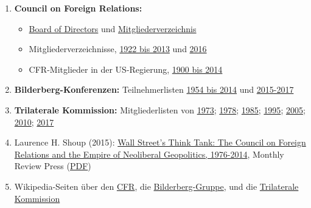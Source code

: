 \begin{enumerate}
\def\labelenumi{\arabic{enumi}.}
\tightlist
\item
  \textbf{Council on Foreign Relations:}

  \begin{itemize}
  \tightlist
  \item
    \href{https://www.cfr.org/board-directors}{Board of Directors} und
    \href{https://www.cfr.org/membership}{Mitgliederverzeichnis}
  \item
    Mitgliederverzeichnisse,
    \href{https://swprs.files.wordpress.com/2017/07/council-on-foreign-relations-membership-rosters-1922-2013.pdf}{1922
    bis 2013} und
    \href{https://swprs.files.wordpress.com/2017/07/cfr-members-2016.pdf}{2016}
  \item
    CFR-Mitglieder in der US-Regierung,
    \href{https://swprs.files.wordpress.com/2017/07/cfr-administration-members-1900-2014.pdf}{1900
    bis 2014}
  \end{itemize}
\item
  \textbf{Bilderberg-Konferenzen:} Teilnehmerlisten
  \href{https://swprs.files.wordpress.com/2016/07/bilderberg_teilnehmer_1954-2014.pdf}{1954
  bis 2014} und
  \href{http://www.bilderbergmeetings.org/latest-meetings.html}{2015-2017}
\item
  \textbf{Trilaterale Kommission:} Mitgliederlisten von
  \href{https://swprs.files.wordpress.com/2017/07/trilateral-commission-members-1973.pdf}{1973};
  \href{https://swprs.files.wordpress.com/2017/07/trilateral-commission-members-1978.pdf}{1978};
  \href{https://swprs.files.wordpress.com/2017/07/trilateral-commission-members-1985.pdf}{1985};
  \href{https://swprs.files.wordpress.com/2017/07/trilateral-commission-members-1995.pdf}{1995};
  \href{https://swprs.files.wordpress.com/2019/12/trilateral-commission-members-2005.pdf}{2005};
  \href{https://swprs.files.wordpress.com/2017/07/trilateral-commission-members-2010.pdf}{2010};
  \href{https://swprs.files.wordpress.com/2017/07/trilateral-commission-members-2017.pdf}{2017}
\item
  Laurence H. Shoup (2015):
  \href{https://monthlyreview.org/product/wall-streets-think-tank/}{Wall
  Street's Think Tank: The Council on Foreign Relations and the Empire
  of Neoliberal Geopolitics, 1976-2014}, Monthly Review Press
  (\href{https://swprs.files.wordpress.com/2019/08/cfr-wallstreet-think-tank-shoup-2015.pdf}{PDF})
\item
  Wikipedia-Seiten über den
  \href{https://en.wikipedia.org/wiki/Council_on_Foreign_Relations}{CFR},
  die
  \href{https://en.wikipedia.org/wiki/Bilderberg_Group}{Bilderberg-Gruppe},
  und die
  \href{https://en.wikipedia.org/wiki/Trilateral_commission}{Trilaterale
  Kommission}
\end{enumerate}

